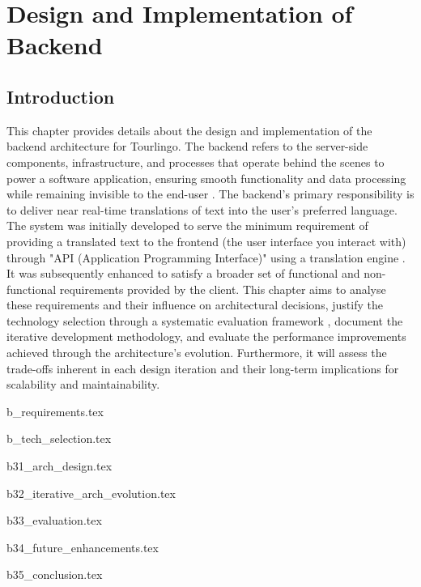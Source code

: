 \section{Design and Implementation of Backend}\label{sec:backend}

\subsection{Introduction}
This chapter provides details about the design and implementation of the backend architecture for Tourlingo. The backend refers to the server-side components, infrastructure, and processes that operate behind the scenes to power a software application, ensuring smooth functionality and data processing while remaining invisible to the end-user \cite{Backend-def}. The backend's primary responsibility is to deliver near real-time translations of text into the user's preferred language. The system was initially developed to serve the minimum requirement of providing a translated text to the frontend (the user interface you interact with) through "API (Application Programming Interface)" \cite{what-is-an-api} using a translation engine \cite{machine-translation}\cite{libretranslate}. It was subsequently enhanced to satisfy a broader set of functional and non-functional requirements provided by the client. This chapter aims to analyse these requirements and their influence on architectural decisions\cite{parmar2011architectural}, justify the technology selection through a systematic evaluation framework \cite{mcda}\cite{decision-matrix-software-development}, document the iterative development methodology, and evaluate the performance improvements achieved through the architecture's evolution. Furthermore, it will assess the trade-offs inherent in each design iteration and their long-term implications for scalability and maintainability. 

{b_requirements.tex}

{b_tech_selection.tex}

{b31_arch_design.tex}

{b32_iterative_arch_evolution.tex}

{b33_evaluation.tex}

{b34_future_enhancements.tex}

{b35_conclusion.tex}

